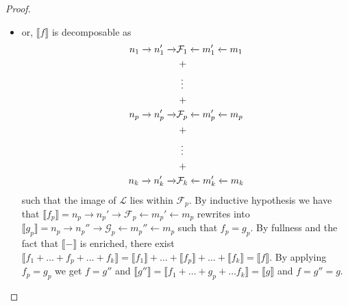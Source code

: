\begin{proof}
\begin{itemize}
		\item or, $\llbracket f \rrbracket$ is decomposable as
		\begin{align*}
			n_1 \xrightarrow{} n_1' \xrightarrow{} &\mathcal{F}_1 \xleftarrow{} m_1' \xleftarrow{} m_1\\
			&\;+\\
			&\vdotswithin{+}\\
			&\;+\\
			n_p \xrightarrow{} n_p' \xrightarrow{} &\mathcal{F}_p \xleftarrow{} m_p' \xleftarrow{} m_p\\
			&\;+\\
			&\vdotswithin{+}\\
			&\;+\\
			n_k \xrightarrow{} n_k' \xrightarrow{} &\mathcal{F}_k \xleftarrow{} m_k' \xleftarrow{} m_k
		\end{align*}
		such that the image of $\mathcal{L}$ lies within $\mathcal{F}_{p}$.
		By inductive hypothesis we have that $\llbracket f_{p} \rrbracket = n_p \xrightarrow{} n_{p}' \xrightarrow{} \mathcal{F}_{p} \xleftarrow{} m_{p}' \xleftarrow{} m_{p}$ rewrites into $\llbracket g_{p} \rrbracket = n_p \xrightarrow{} n_{p}'' \xrightarrow{} \mathcal{G}_{p} \xleftarrow{} m_{p}'' \xleftarrow{} m_{p}$ such that $f_{p} = g_{p}$.
		By fullness and the fact that $\llbracket - \rrbracket$ is enriched, there exist $\llbracket f_1 + \ldots + f_{p} + \ldots + f_{k} \rrbracket = \llbracket f_{1} \rrbracket + \ldots + \llbracket f_{p} \rrbracket + \ldots + \llbracket f_{k} \rrbracket = \llbracket f \rrbracket$.
		By applying $f_{p} = g_{p}$ we get $f = g''$ and $\llbracket g'' \rrbracket = \llbracket f_{1} + \ldots + g_{p} + \ldots f_{k} \rrbracket = \llbracket g \rrbracket$ and $f = g'' = g$.
\end{itemize}
\end{proof}

